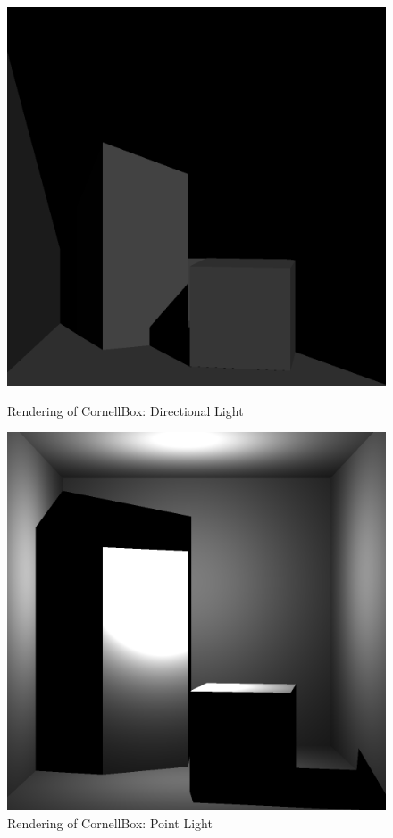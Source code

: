 \documentclass[a4paper]{myarticle}
\begin{document}
\begin{figure}[H]
    \begin{minipage}[t]{.4\textwidth}
        \centering
        \includegraphics[width=\textwidth]{q1/CornellBox/directional_light.png}
        \caption{Rendering of CornellBox: Directional Light}
    \end{minipage}
    \hfill
    \begin{minipage}[t]{.4\textwidth}
        \centering
        \includegraphics[width=\textwidth]{q1/CornellBox/point_light.png}
        \caption{Rendering of CornellBox: Point Light}
    \end{minipage}
\end{figure}
\end{document}
